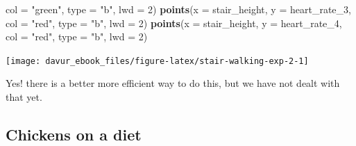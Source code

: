 \documentclass[]{book}
\newenvironment{Shaded}{\begin{snugshade}}{\end{snugshade}}
\newcommand{\DataTypeTok}[1]{\textcolor[rgb]{0.13,0.29,0.53}{#1}}
\newcommand{\DecValTok}[1]{\textcolor[rgb]{0.00,0.00,0.81}{#1}}
\newcommand{\KeywordTok}[1]{\textcolor[rgb]{0.13,0.29,0.53}{\textbf{#1}}}
\newcommand{\NormalTok}[1]{#1}
\newcommand{\StringTok}[1]{\textcolor[rgb]{0.31,0.60,0.02}{#1}}
\begin{document}
\begin{Shaded}
\begin{Highlighting}[]
    \DataTypeTok{col =} \StringTok{"green"}\NormalTok{,}
    \DataTypeTok{type =} \StringTok{"b"}\NormalTok{,}
    \DataTypeTok{lwd =} \DecValTok{2}\NormalTok{)}
\KeywordTok{points}\NormalTok{(}\DataTypeTok{x =}\NormalTok{ stair_height,}
    \DataTypeTok{y =}\NormalTok{ heart_rate_}\DecValTok{3}\NormalTok{,}
    \DataTypeTok{col =} \StringTok{"red"}\NormalTok{,}
    \DataTypeTok{type =} \StringTok{"b"}\NormalTok{,}
    \DataTypeTok{lwd =} \DecValTok{2}\NormalTok{)}
\KeywordTok{points}\NormalTok{(}\DataTypeTok{x =}\NormalTok{ stair_height,}
    \DataTypeTok{y =}\NormalTok{ heart_rate_}\DecValTok{4}\NormalTok{,}
    \DataTypeTok{col =} \StringTok{"red"}\NormalTok{,}
    \DataTypeTok{type =} \StringTok{"b"}\NormalTok{,}
    \DataTypeTok{lwd =} \DecValTok{2}\NormalTok{)}
\end{Highlighting}
\end{Shaded}

\begin{center}\texttt{[image: davur\_ebook\_files/figure-latex/stair-walking-exp-2-1]} \end{center}

Yes! there is a better more efficient way to do this, but we have not dealt with that yet.

\hypertarget{chickens-on-a-diet-1}{%
\subsection{Chickens on a diet}\label{chickens-on-a-diet-1}}
\end{document}
